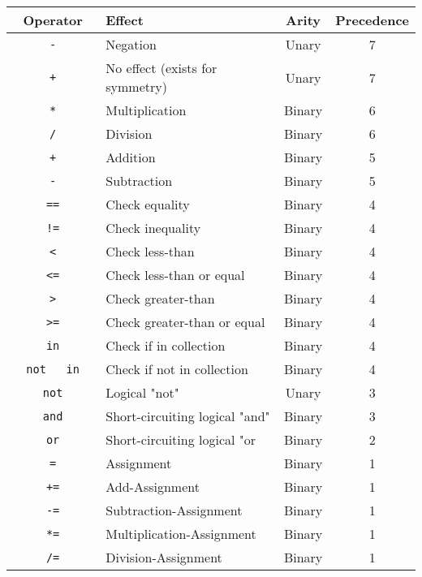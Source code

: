 \begin{longtable}[]{@{}clcc@{}}
\toprule\noalign{}
Operator & Effect & Arity & Precedence \\
\midrule\noalign{}
\endhead
\bottomrule\noalign{}
\endlastfoot
\texttt{\ }{\texttt{\ -\ }}\texttt{\ } & Negation & Unary & 7 \\
\texttt{\ }{\texttt{\ +\ }}\texttt{\ } & No effect (exists for symmetry)
& Unary & 7 \\
\texttt{\ *\ } & Multiplication & Binary & 6 \\
\texttt{\ /\ } & Division & Binary & 6 \\
\texttt{\ }{\texttt{\ +\ }}\texttt{\ } & Addition & Binary & 5 \\
\texttt{\ }{\texttt{\ -\ }}\texttt{\ } & Subtraction & Binary & 5 \\
\texttt{\ ==\ } & Check equality & Binary & 4 \\
\texttt{\ !=\ } & Check inequality & Binary & 4 \\
\texttt{\ \textless{}\ } & Check less-than & Binary & 4 \\
\texttt{\ \textless{}=\ } & Check less-than or equal & Binary & 4 \\
\texttt{\ \textgreater{}\ } & Check greater-than & Binary & 4 \\
\texttt{\ \textgreater{}=\ } & Check greater-than or equal & Binary &
4 \\
\texttt{\ in\ } & Check if in collection & Binary & 4 \\
\texttt{\ }{\texttt{\ not\ }}\texttt{\ }{\texttt{\ in\ }}\texttt{\ } &
Check if not in collection & Binary & 4 \\
\texttt{\ }{\texttt{\ not\ }}\texttt{\ } & Logical "not" & Unary & 3 \\
\texttt{\ and\ } & Short-circuiting logical "and" & Binary & 3 \\
\texttt{\ or\ } & Short-circuiting logical "or & Binary & 2 \\
\texttt{\ =\ } & Assignment & Binary & 1 \\
\texttt{\ +=\ } & Add-Assignment & Binary & 1 \\
\texttt{\ -=\ } & Subtraction-Assignment & Binary & 1 \\
\texttt{\ *=\ } & Multiplication-Assignment & Binary & 1 \\
\texttt{\ /=\ } & Division-Assignment & Binary & 1 \\
\end{longtable}

\href{/docs/reference/styling/}{\pandocbounded{}}

